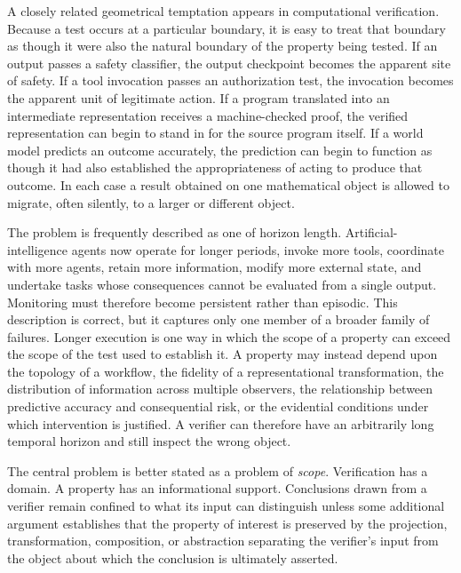 \documentclass[11pt]{article}
\begin{document}
A closely related geometrical temptation appears in computational verification. Because a test occurs at a particular boundary, it is easy to treat that boundary as though it were also the natural boundary of the property being tested. If an output passes a safety classifier, the output checkpoint becomes the apparent site of safety. If a tool invocation passes an authorization test, the invocation becomes the apparent unit of legitimate action. If a program translated into an intermediate representation receives a machine-checked proof, the verified representation can begin to stand in for the source program itself. If a world model predicts an outcome accurately, the prediction can begin to function as though it had also established the appropriateness of acting to produce that outcome. In each case a result obtained on one mathematical object is allowed to migrate, often silently, to a larger or different object.

The problem is frequently described as one of horizon length. Artificial-intelligence agents now operate for longer periods, invoke more tools, coordinate with more agents, retain more information, modify more external state, and undertake tasks whose consequences cannot be evaluated from a single output. Monitoring must therefore become persistent rather than episodic. This description is correct, but it captures only one member of a broader family of failures. Longer execution is one way in which the scope of a property can exceed the scope of the test used to establish it. A property may instead depend upon the topology of a workflow, the fidelity of a representational transformation, the distribution of information across multiple observers, the relationship between predictive accuracy and consequential risk, or the evidential conditions under which intervention is justified. A verifier can therefore have an arbitrarily long temporal horizon and still inspect the wrong object.

The central problem is better stated as a problem of \emph{scope}. Verification has a domain. A property has an informational support. Conclusions drawn from a verifier remain confined to what its input can distinguish unless some additional argument establishes that the property of interest is preserved by the projection, transformation, composition, or abstraction separating the verifier's input from the object about which the conclusion is ultimately asserted.
\end{document}
